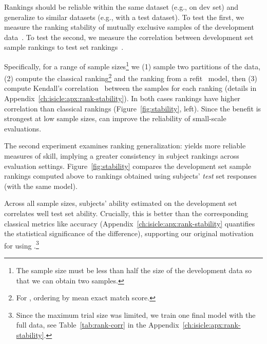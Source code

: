 \begin{figure*}[t]
    \centering
    \caption{
        Compared to the final ranking over a large test set, how well does a small test set correlate?
                The left shows correlation between mutually exclusive development set samples and the right between development samples and the full test set.
                In both experiments (panes), ranking systems by \irt{} ability is more stable---across all sample sizes---than mean accuracy and thus more reliable (Kendall's rank correlation is higher).
                Bands show 95\% confidence intervals of rank correlations across ten trials per sample size.
    }
    \label{fig:stability}
\end{figure*}

Rankings should be reliable within the same dataset (e.g., on dev
set) and generalize to similar datasets (e.g., with a test dataset).
To test the first, we measure the ranking stability of mutually
exclusive samples of the development
data~\cite{buckley2000measure}.
To test the second, we measure the correlation between
development set sample rankings to test set rankings~\citep{voorhees1998var}.

Specifically, for a range of sample sizes\footnote{ The sample size
    must be less than half the size of the development data so that we
    can obtain two samples.  } we (1) sample two partitions of the data,
(2) compute the classical ranking\footnote{For \squad{}, ordering by
    mean exact match score.} and the \irt{} ranking from a refit
~model, then (3) compute Kendall's
correlation~\citep{kendall1938tau} between the samples for each
ranking (details in Appendix~\ref{ch:isicle:apx:rank-stability}).
In both cases \irt{} rankings have higher correlation than classical
rankings (Figure~\ref{fig:stability}, left).
Since the benefit is strongest at low sample sizes, \irt{} can improve
the reliability of small-scale evaluations.

The second experiment examines ranking generalization: \irt{} yields more reliable measures of \subj{} skill,  implying a greater consistency in subject rankings across evaluation settings.
Figure~\ref{fig:stability} compares the development set sample rankings computed above to rankings obtained using subjects' \emph{test} set responses (with the same \irt{} model).

Across all sample sizes, subjects' \irt{} ability estimated on the
development set correlates well test set ability.
Crucially, this is better than the corresponding classical metrics
like accuracy (Appendix~\ref{ch:isicle:apx:rank-stability} quantifies
the statistical significance of the difference), supporting our
original motivation for using \irt{}.\footnote{ Since the maximum trial size was
    limited, we train one final model with the full data, see
    Table~\ref{tab:rank-corr} in the
    Appendix~\ref{ch:isicle:apx:rank-stability}.  }

